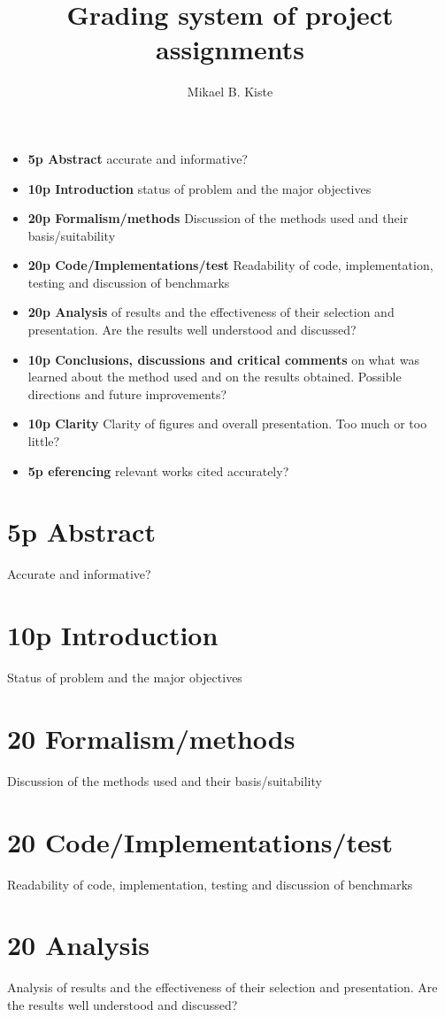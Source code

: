 \documentclass{article}
\title{Grading system of project assignments}
\author{Mikael B. Kiste}
\begin{document}
	\maketitle
	\begin{itemize}
	\item{\textbf{5p Abstract} accurate and informative?}
	\item{\textbf{10p Introduction} status of problem and the major objectives}
	\item{\textbf{20p Formalism/methods} Discussion of the methods used and their basis/suitability}
	\item{\textbf{20p Code/Implementations/test} Readability of code, implementation, testing and discussion of benchmarks}
	\item{\textbf{20p Analysis} of results and the effectiveness of their selection and presentation. Are the results well understood and discussed?}
	\item{\textbf{10p Conclusions, discussions and critical comments} on what was learned about the method used and on the results obtained. Possible directions and future improvements?}
	\item{\textbf{10p Clarity} Clarity of figures and overall presentation. Too much or too little?}
	\item{\textbf{5p eferencing} relevant works cited accurately?}
	\end{itemize}

	\newpage
	\section*{5p Abstract}
	Accurate and informative?
	\section*{10p Introduction}
	Status of problem and the major objectives
	\section*{20 Formalism/methods}
	Discussion of the methods used and their basis/suitability
	\section*{20 Code/Implementations/test}
	Readability of code, implementation, testing and discussion of benchmarks
	\section*{20 Analysis}
	Analysis of results and the effectiveness of their selection and presentation. Are the results well understood and discussed?
\end{document}
